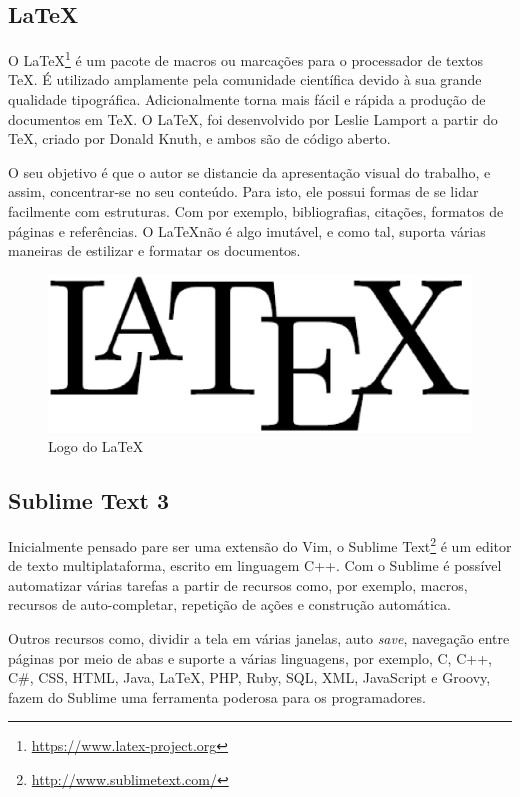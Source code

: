 \subsection{LaTeX}

O \LaTeX\footnote{\url{https://www.latex-project.org}} é um pacote de macros ou marcações para o processador de textos \TeX. É utilizado amplamente pela comunidade científica devido à sua grande qualidade tipográfica. Adicionalmente torna mais fácil e rápida a produção de documentos em \TeX. O \LaTeX, foi desenvolvido por Leslie Lamport a partir do \TeX, criado por Donald Knuth, e ambos são de código aberto.

O seu objetivo é que o autor se distancie da apresentação visual do trabalho, e assim, concentrar-se no seu conteúdo. Para isto, ele possui formas de se lidar facilmente com estruturas. Com por exemplo, bibliografias, citações, formatos de páginas e referências. O \LaTeX não é algo imutável, e como tal, suporta várias maneiras de estilizar e formatar os documentos.

\begin{figure}[!h]
	\centering
	\includegraphics[scale=0.3]{figuras/capitulo3/latex.eps}
	\caption{Logo do \LaTeX}
	\label{latex}
\end{figure}

\subsection{Sublime Text 3}

Inicialmente pensado pare ser uma extensão do Vim, o Sublime Text\footnote{\url{http://www.sublimetext.com/}} é um editor de texto multiplataforma, escrito em linguagem C++. Com o Sublime é possível automatizar várias tarefas a partir de recursos como, por exemplo, macros, recursos de auto-completar, repetição de ações e construção automática.

Outros recursos como, dividir a tela em várias janelas, auto \textit{save}, navegação entre páginas por meio de abas e suporte a várias linguagens, por exemplo, C, C++, C\#, CSS, HTML, Java, \LaTeX, PHP, Ruby, SQL, XML, JavaScript e Groovy, fazem do Sublime uma ferramenta poderosa para os programadores.

